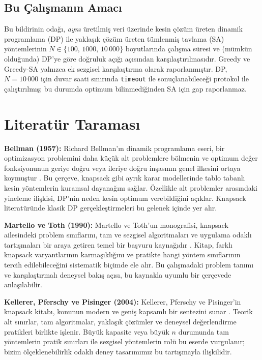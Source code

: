 \documentclass[conference,a4paper]{IEEEtran}
\begin{document}
\subsection{Bu Çalışmanın Amacı}
Bu bildirinin odağı, \emph{aynı} üretilmiş veri üzerinde kesin çözüm üreten dinamik programlama (DP) ile yaklaşık çözüm üreten tümlenmiş tavlama (SA) yöntemlerinin $N \in \{100,\,1000,\,10\,000\}$ boyutlarında çalışma süresi ve (mümkün olduğunda) DP'ye göre doğruluk açığı açısından karşılaştırılmasıdır. Greedy ve Greedy-SA yalnızca ek sezgisel karşılaştırma olarak raporlanmıştır. DP, $N{=}10\,000$ için duvar saati sınırında \texttt{timeout} ile sonuçlanabileceği protokol ile çalıştırılmış; bu durumda optimum bilinmediğinden SA için gap raporlanmaz.

\section{Literatür Taraması}

\textbf{Bellman (1957):} Richard Bellman'ın dinamik programlama eseri, bir optimizasyon problemini daha küçük alt problemlere bölmenin ve optimum değer fonksiyonunun geriye doğru veya ileriye doğru inşasının genel ilkesini ortaya koymuştur \cite{bellman1957dynamic}. Bu çerçeve, knapsack gibi ayrık karar modellerinde tablo tabanlı kesin yöntemlerin kuramsal dayanağını sağlar. Özellikle alt problemler arasındaki yineleme ilişkisi, DP'nin neden kesin optimum verebildiğini açıklar. Knapsack literatüründe klasik DP gerçekleştirmeleri bu gelenek içinde yer alır.

\textbf{Martello ve Toth (1990):} Martello ve Toth'un monografisi, knapsack ailesindeki problem sınıflarını, tam ve sezgisel algoritmaları ve uygulama odaklı tartışmaları bir araya getiren temel bir başvuru kaynağıdır \cite{martello1990knapsack}. Kitap, farklı knapsack varyantlarının karmaşıklığını ve pratikte hangi yöntem sınıflarının tercih edilebileceğini sistematik biçimde ele alır. Bu çalışmadaki problem tanımı ve karşılaştırmalı deneysel bakış açısı, bu kaynakla uyumlu bir çerçevede anlaşılabilir.

\textbf{Kellerer, Pferschy ve Pisinger (2004):} Kellerer, Pferschy ve Pisinger'in knapsack kitabı, konunun modern ve geniş kapsamlı bir sentezini sunar \cite{kellerer2004knapsack}. Teorik alt sınırlar, tam algoritmalar, yaklaşık çözümler ve deneysel değerlendirme pratikleri birlikte işlenir. Büyük kapasite veya büyük $n$ durumunda tam yöntemlerin pratik sınırları ile sezgisel yöntemlerin rolü bu eserde vurgulanır; bizim ölçeklenebilirlik odaklı deney tasarımımız bu tartışmayla ilişkilidir.
\end{document}
